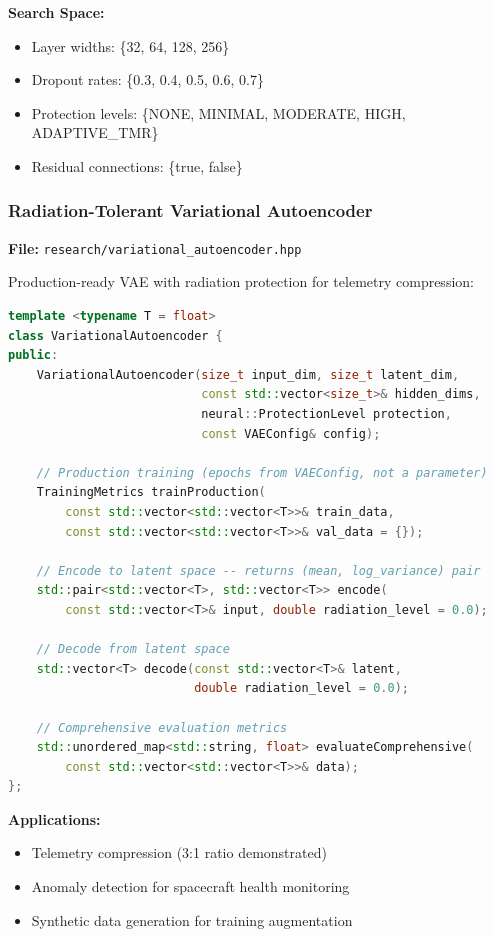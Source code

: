 \documentclass[11pt,a4paper]{article}
\begin{document}
\textbf{Search Space:}
\begin{itemize}
    \item Layer widths: \{32, 64, 128, 256\}
    \item Dropout rates: \{0.3, 0.4, 0.5, 0.6, 0.7\}
    \item Protection levels: \{NONE, MINIMAL, MODERATE, HIGH, ADAPTIVE\_TMR\}
    \item Residual connections: \{true, false\}
\end{itemize}

\subsubsection{Radiation-Tolerant Variational Autoencoder}

\textbf{File:} \texttt{research/variational\_autoencoder.hpp}

Production-ready VAE with radiation protection for telemetry compression:

\begin{lstlisting}[language=C++, basicstyle=\footnotesize\ttfamily]
template <typename T = float>
class VariationalAutoencoder {
public:
    VariationalAutoencoder(size_t input_dim, size_t latent_dim,
                           const std::vector<size_t>& hidden_dims,
                           neural::ProtectionLevel protection,
                           const VAEConfig& config);

    // Production training (epochs from VAEConfig, not a parameter)
    TrainingMetrics trainProduction(
        const std::vector<std::vector<T>>& train_data,
        const std::vector<std::vector<T>>& val_data = {});

    // Encode to latent space -- returns (mean, log_variance) pair
    std::pair<std::vector<T>, std::vector<T>> encode(
        const std::vector<T>& input, double radiation_level = 0.0);

    // Decode from latent space
    std::vector<T> decode(const std::vector<T>& latent,
                          double radiation_level = 0.0);

    // Comprehensive evaluation metrics
    std::unordered_map<std::string, float> evaluateComprehensive(
        const std::vector<std::vector<T>>& data);
};
\end{lstlisting}

\textbf{Applications:}
\begin{itemize}
    \item Telemetry compression (3:1 ratio demonstrated)
    \item Anomaly detection for spacecraft health monitoring
    \item Synthetic data generation for training augmentation
\end{itemize}
\end{document}
